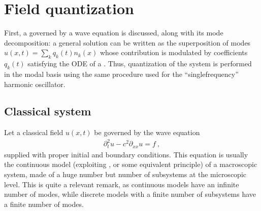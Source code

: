 \documentclass[letterpaper,10pt,english]{jupyterBook}
\begin{document}
\section{Field quantization}
\label{\detokenize{ch/quantum-mechanics/qft/field-quantization:field-quantization}}\label{\detokenize{ch/quantum-mechanics/qft/field-quantization:quantum-mechanics-qft-field-quantization}}\label{\detokenize{ch/quantum-mechanics/qft/field-quantization::doc}}
\sphinxAtStartPar
First, a {\hyperref[\detokenize{ch/quantum-mechanics/qft/field-quantization:quantum-mechanics-qft-field-quantization-classical}]{}} governed by a wave equation is discussed, along with its mode decomposition: a general solution can be written as the superposition of modes \(u(x,t) = \sum_k q_k(t) n_k(x)\) whose contribution is modulated by coefficients \(q_k(t)\) satisfying the ODE of a {\hyperref[\detokenize{ch/quantum-mechanics/qft/harmonic-oscillator:quantum-mechanics-qft-harmonic-oscillator}]{}}. Thus, quantization of the system is performed in the modal basis using the same procedure used for the “single\sphinxhyphen{}frequency” harmonic oscillator.


\subsection{Classical system}
\label{\detokenize{ch/quantum-mechanics/qft/field-quantization:classical-system}}\label{\detokenize{ch/quantum-mechanics/qft/field-quantization:quantum-mechanics-qft-field-quantization-classical}}
\sphinxAtStartPar
Let a classical field \(u(x,t)\) be governed by the wave equation
\begin{equation*}
\begin{split}
\partial_t^2u-c^2\partial_{xx}u=f \ ,
\end{split}
\end{equation*}
\sphinxAtStartPar
supplied with proper initial and boundary conditions. This equation is usually the continuous model (exploiting , or some equivalent principle) of a macroscopic system, made of a huge number \sphinxhyphen{} but  number \sphinxhyphen{} of sub\sphinxhyphen{}systems at the microscopic level. This is quite a relevant remark, as continuous models have an infinite number of modes, while discrete models with a finite number of sub\sphinxhyphen{}systems have a finite number of modes.
\end{document}
